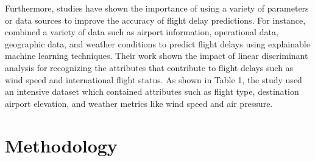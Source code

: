 \documentclass[twoside,11pt]{article}
\begin{document}
Furthermore, studies have shown the importance of using a variety of parameters or data sources to improve the accuracy of flight delay predictions. For instance, \cite{integratingMultipleData} combined a variety of data such as airport information, operational data, geographic data, and weather conditions to predict flight delays using explainable machine learning techniques. Their work shown the impact of linear discriminant analysis for recognizing the attributes that contribute to flight delays such as wind speed and international flight status. As shown in Table 1, the study used an intensive dataset which contained attributes such as flight type, destination airport elevation, and weather metrics like wind speed and air pressure.  

\section{Methodology}
\end{document}
